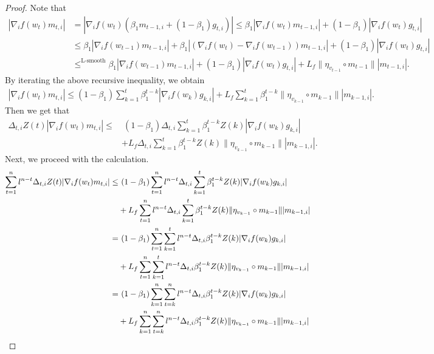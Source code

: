 \documentclass{article} %
\begin{document}
\begin{proof}
Note that
\begin{align*}
|\nabla_{i} f(w_{t})m_{t,i}|&=|\nabla_{i}f(w_{t})(\beta_{1}m_{t-1,i}+(1-\beta_{1})g_{t,i})|\le \beta_{1}|\nabla_{i}f(w_{t})m_{t-1,i} |+(1-\beta_{1})|\nabla_{i} f(w_{t})g_{t,i}|\\& \le \beta_{1}|\nabla_{i}f(w_{t-1})m_{t-1,i}|+\beta_{1}|(\nabla_{i} f(w_{t})-\nabla_{i}f(w_{t-1}))m_{t-1,i}|+ (1-\beta_{1})|\nabla_{i} f(w_{t})g_{t,i}| \\&\mathop{\le}^{\text{L-smooth}}\beta_{1}|\nabla_{i}f(w_{t-1})m_{t-1,i}|+(1-\beta_{1})|\nabla_{i} f(w_{t})g_{t,i}|+L_{f}\|\eta_{v_{t-1}}\circ m_{t-1}\||m_{t-1,i}|.
\end{align*}
By iterating the above recursive inequality, we obtain
\begin{align*}
|\nabla_{i} f(w_{t})m_{t,i}|\le (1-\beta_{1})\sum_{k=1}^{t}\beta_{1}^{t-k} |\nabla_{i} f(w_{k})g_{k,i}|+L_{f}\sum_{k=1}^{t}\beta_{1}^{t-k}\|\eta_{v_{k-1}}\circ m_{k-1}\||m_{k-1,i}|.   
\end{align*}
Then we get that
\begin{align*}
\Delta_{t,i}Z(t)|\nabla_{i} f(w_{t})m_{t,i}|\le&\ (1-\beta_{1})\Delta_{t,i}\sum_{k=1}^{t}\beta_{1}^{t-k} Z(k)|\nabla_{i} f(w_{k})g_{k,i}|\\&+L_{f}\Delta_{t,i}\sum_{k=1}^{t}\beta_{1}^{t-k}Z(k)\|\eta_{v_{k-1}}\circ m_{k-1}\||m_{k-1,i}|.   
\end{align*}
Next, we proceed with the calculation.
\begin{align}\label{ert}
\sum_{t=1}^{n}l^{n-t}\Delta_{t,i}Z(t)|\nabla_{i} f(w_{t})m_{t,i}|\le&\ (1-\beta_{1})\sum_{t=1}^{n}l^{n-t}\Delta_{t,i}\sum_{k=1}^{t}\beta_{1}^{t-k} Z(k)|\nabla_{i} f(w_{k})g_{k,i}|\notag\\&+L_{f}\sum_{t=1}^{n}l^{n-t}\Delta_{t,i}\sum_{k=1}^{t}\beta_{1}^{t-k}Z(k)\|\eta_{v_{k-1}}\circ m_{k-1}\||m_{k-1,i}|\notag\\
=&\ (1-\beta_{1})\sum_{t=1}^{n}\sum_{k=1}^{t}l^{n-t}\Delta_{t,i}\beta_{1}^{t-k} Z(k)|\nabla_{i} f(w_{k})g_{k,i}|\notag\\&+L_{f}\sum_{t=1}^{n}\sum_{k=1}^{t}l^{n-t}\Delta_{t,i}\beta_{1}^{t-k}Z(k)\|\eta_{v_{k-1}}\circ m_{k-1}\||m_{k-1,i}|\notag\\
=&\ (1-\beta_{1})\sum_{k=1}^{n}\sum_{t=k}^{n}l^{n-t}\Delta_{t,i}\beta_{1}^{t-k} Z(k)|\nabla_{i} f(w_{k})g_{k,i}|\notag\\&+L_{f}\sum_{k=1}^{n}\sum_{t=k}^{n}l^{n-t}\Delta_{t,i}\beta_{1}^{t-k}Z(k)\|\eta_{v_{k-1}}\circ m_{k-1}\||m_{k-1,i}|\notag\\

\end{align}
\end{proof}
\end{document}
